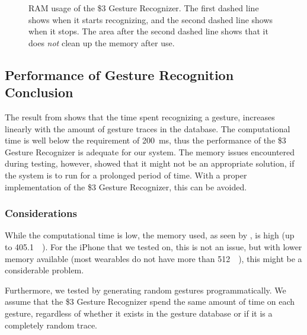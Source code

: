 \begin{figure}[!htb]
  \caption{RAM usage of the \$3 Gesture Recognizer. The first dashed line shows when it starts recognizing, and the second dashed line shows when it stops. The area after the second dashed line shows that it does \emph{not} clean up the memory after use.}
  \label{fig:threedollarmemory}
\end{figure}

\subsection{Performance of Gesture Recognition Conclusion}
The result from  shows that the time spent recognizing a gesture, 
increases linearly with the amount of gesture traces in the database.
The computational time is well below the requirement of \SI{200}{\milli\second},
thus the performance of the \$3 Gesture Recognizer is adequate for our system. 
The memory issues encountered during testing, however, 
showed that it might not be an appropriate solution, 
if the system is to run for a prolonged period of time.
With a proper implementation of the \$3 Gesture Recognizer, 
this can be avoided. 

\subsubsection{Considerations}
While the computational time is low, 
the memory used, as seen by , is high (up to \SI{405.1}{\mega\byte}). 
For the iPhone that we tested on, this is not an issue, 
but with lower memory available (most wearables do not have more than \SI{512}{\mega\byte}), 
this might be a considerable problem. 

Furthermore, we tested by generating random gestures programmatically. 
We assume that the \$3 Gesture Recognizer spend the same amount of time on each gesture, 
regardless of whether it exists in the gesture database or if it is a completely random trace. 

